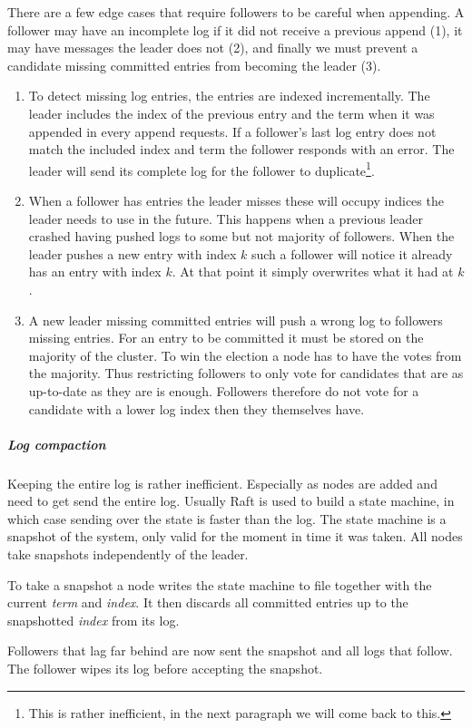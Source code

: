 There are a few edge cases that require followers to be careful when appending. A follower may have an incomplete log if it did not receive a previous append (1), it may have messages the leader does not (2), and finally we must prevent a candidate missing committed entries from becoming the leader (3).
%
\begin{enumerate}
	\item To detect missing log entries, the entries are indexed incrementally. The leader includes the index of the previous entry and the term when it was appended in every append requests. If a follower's last log entry does not match the included index and term the follower responds with an error. The leader will send its complete log for the follower to duplicate\footnote{This is rather inefficient, in the next paragraph we will come back to this.}.
	\item When a follower has entries the leader misses these will occupy indices the leader needs to use in the future. This happens when a previous leader crashed having pushed logs to some but not majority of followers. When the leader pushes a new entry with index $k$ such a follower will notice it already has an entry with index $k$. At that point it simply overwrites what it had at $k$.
	\item A new leader missing committed entries will push a wrong log to followers missing entries. For an entry to be committed it must be stored on the majority of the cluster. To win the election a node has to have the votes from the majority. Thus restricting followers to only vote for candidates that are as up-to-date as they are is enough. Followers therefore do not vote for a candidate with a lower log index then they themselves have.
\end{enumerate}

\subparagraph{Log compaction} \label{par:logcomp}
Keeping the entire log is rather inefficient. Especially as nodes are added and need to get send the entire log. Usually Raft is used to build a state machine, in which case sending over the state is faster than the log. The state machine is a snapshot of the system, only valid for the moment in time it was taken. All nodes take snapshots independently of the leader. 

To take a snapshot a node writes the state machine to file together with the current \textit{term} and \textit{index}. It then discards all committed entries up to the snapshotted \textit{index} from its log. 

Followers that lag far behind are now sent the snapshot and all logs that follow. The follower wipes its log before accepting the snapshot.

